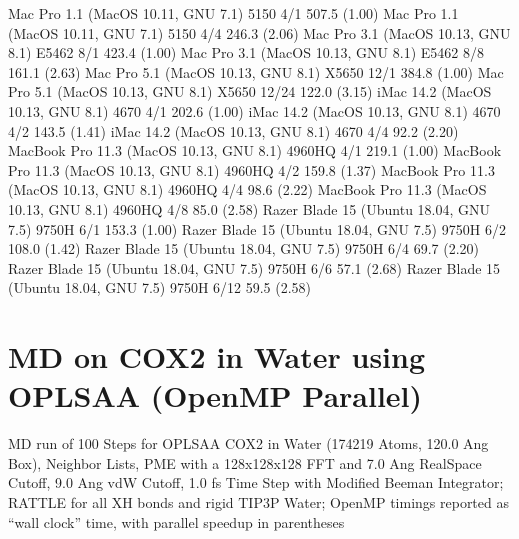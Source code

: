 \documentclass[letterpaper,11pt,english]{sphinxmanual}
\begin{document}

\begin{sphinxVerbatim}[commandchars=\\\{\}]
Mac Pro 1.1 (MacOS 10.11, GNU 7.1)             5150           4/1       507.5 (1.00)
Mac Pro 1.1 (MacOS 10.11, GNU 7.1)             5150           4/4       246.3 (2.06)
Mac Pro 3.1 (MacOS 10.13, GNU 8.1)            E5462           8/1       423.4 (1.00)
Mac Pro 3.1 (MacOS 10.13, GNU 8.1)            E5462           8/8       161.1 (2.63)
Mac Pro 5.1 (MacOS 10.13, GNU 8.1)            X5650          12/1       384.8 (1.00)
Mac Pro 5.1 (MacOS 10.13, GNU 8.1)            X5650         12/24       122.0 (3.15)
iMac 14.2 (MacOS 10.13, GNU 8.1)               4670           4/1       202.6 (1.00)
iMac 14.2 (MacOS 10.13, GNU 8.1)               4670           4/2       143.5 (1.41)
iMac 14.2 (MacOS 10.13, GNU 8.1)               4670           4/4        92.2 (2.20)
MacBook Pro 11.3 (MacOS 10.13, GNU 8.1)      4960HQ           4/1       219.1 (1.00)
MacBook Pro 11.3 (MacOS 10.13, GNU 8.1)      4960HQ           4/2       159.8 (1.37)
MacBook Pro 11.3 (MacOS 10.13, GNU 8.1)      4960HQ           4/4        98.6 (2.22)
MacBook Pro 11.3 (MacOS 10.13, GNU 8.1)      4960HQ           4/8        85.0 (2.58)
Razer Blade 15 (Ubuntu 18.04, GNU 7.5)        9750H           6/1       153.3 (1.00)
Razer Blade 15 (Ubuntu 18.04, GNU 7.5)        9750H           6/2       108.0 (1.42)
Razer Blade 15 (Ubuntu 18.04, GNU 7.5)        9750H           6/4        69.7 (2.20)
Razer Blade 15 (Ubuntu 18.04, GNU 7.5)        9750H           6/6        57.1 (2.68)
Razer Blade 15 (Ubuntu 18.04, GNU 7.5)        9750H          6/12        59.5 (2.58)
\end{sphinxVerbatim}


\section{MD on COX\sphinxhyphen{}2 in Water using OPLS\sphinxhyphen{}AA (OpenMP Parallel)}
\label{\detokenize{text/benchmarks:md-on-cox-2-in-water-using-opls-aa-openmp-parallel}}
MD run of 100 Steps for OPLS\sphinxhyphen{}AA COX\sphinxhyphen{}2 in Water (174219 Atoms, 120.0 Ang Box), Neighbor Lists, PME with a 128x128x128 FFT and 7.0 Ang Real\sphinxhyphen{}Space Cutoff, 9.0 Ang vdW Cutoff, 1.0 fs Time Step with Modified Beeman Integrator; RATTLE for all X\sphinxhyphen{}H bonds and rigid TIP3P Water; OpenMP timings reported as “wall clock” time, with parallel speedup in parentheses
\end{document}
